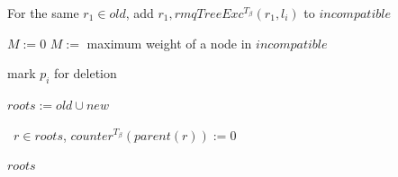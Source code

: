 \documentclass{article}
\newcommand{\weight}{\omega}
\newcommand{\TB}{T_\beta}
\begin{document}
\begin{algorithm}[ht]
\begin{algorithmic}[1]
                    \State For the same $r_1 \in old$, add $r_1, rmqTreeExc^{\TB}(r_1, l_i)$ to $incompatible$
                \EndIf

                    {$M := 0$}
                    $M :=$ maximum weight of a node in $incompatible$

                \IIf{$\weight(p_i) \leq M$}
                    mark $p_i$ for deletion

                \State $roots := old \cup new$
            \EndFor

            \State \algorithmicforall\ $r \in roots$, $counter^{\TB}(parent(r)) := 0$

            \State \Return $roots$
        \end{algorithmic}
    \end{algorithm}
\end{document}
